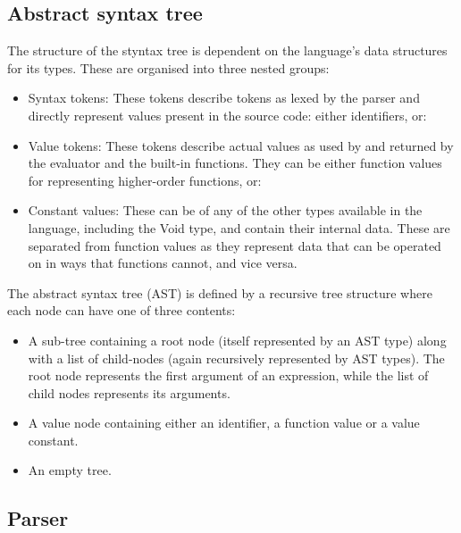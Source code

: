 \documentclass[11pt]{article}
\begin{document}
\subsection{Abstract syntax tree}
    The structure of the styntax tree is dependent on the language's data structures for its types. These are organised into three nested groups:
    \begin{itemize}
        \item Syntax tokens: \newline
              These tokens describe tokens as lexed by the parser and directly represent values present in the source code:
              either identifiers, or:
        \item Value tokens: \newline
              These tokens describe actual values as used by and returned by the evaluator and the built-in functions. They can be either function
              values for representing higher-order functions, or:
        \item Constant values: \newline
              These can be of any of the other types available in the language, including the Void type, and contain their internal data.
              These are separated from function values as they represent data that can be operated on in ways that functions cannot, and vice versa.
    \end{itemize}
    The abstract syntax tree (AST) is defined by a recursive tree structure where each node can have one of three contents:
    \begin{itemize}
        \item A sub-tree containing a root node (itself represented by an AST type) along with a list of child-nodes (again recursively
              represented by AST types). The root node represents the first argument of an expression, while the list of child nodes represents
              its arguments.
        \item A value node containing either an identifier, a function value or a value constant.
        \item An empty tree.
    \end{itemize}

\subsection{Parser}
\end{document}
